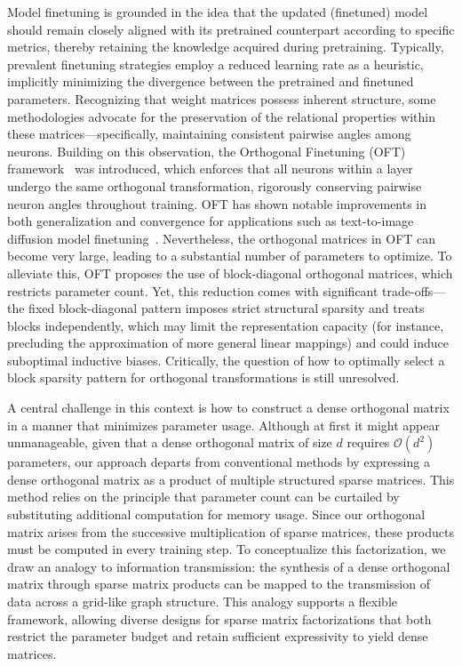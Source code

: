 Model finetuning is grounded in the idea that the updated (finetuned) model should remain closely aligned with its pretrained counterpart according to specific metrics, thereby retaining the knowledge acquired during pretraining. Typically, prevalent finetuning strategies employ a reduced learning rate as a heuristic, implicitly minimizing the divergence between the pretrained and finetuned parameters. Recognizing that weight matrices possess inherent structure, some methodologies advocate for the preservation of the relational properties within these matrices—specifically, maintaining consistent pairwise angles among neurons. Building on this observation, the Orthogonal Finetuning (OFT) framework~\cite{qiu2023controlling} was introduced, which enforces that all neurons within a layer undergo the same orthogonal transformation, rigorously conserving pairwise neuron angles throughout training. OFT has shown notable improvements in both generalization and convergence for applications such as text-to-image diffusion model finetuning~\cite{qiu2023controlling}. Nevertheless, the orthogonal matrices in OFT can become very large, leading to a substantial number of parameters to optimize. To alleviate this, OFT proposes the use of block-diagonal orthogonal matrices, which restricts parameter count. Yet, this reduction comes with significant trade-offs—the fixed block-diagonal pattern imposes strict structural sparsity and treats blocks independently, which may limit the representation capacity (for instance, precluding the approximation of more general linear mappings) and could induce suboptimal inductive biases. Critically, the question of how to optimally select a block sparsity pattern for orthogonal transformations is still unresolved.

A central challenge in this context is how to construct a dense orthogonal matrix in a manner that minimizes parameter usage. Although at first it might appear unmanageable, given that a dense orthogonal matrix of size $d$ requires $\mathcal{O}(d^2)$ parameters, our approach departs from conventional methods by expressing a dense orthogonal matrix as a product of multiple structured sparse matrices. This method relies on the principle that parameter count can be curtailed by substituting additional computation for memory usage. Since our orthogonal matrix arises from the successive multiplication of sparse matrices, these products must be computed in every training step. To conceptualize this factorization, we draw an analogy to information transmission: the synthesis of a dense orthogonal matrix through sparse matrix products can be mapped to the transmission of data across a grid-like graph structure. This analogy supports a flexible framework, allowing diverse designs for sparse matrix factorizations that both restrict the parameter budget and retain sufficient expressivity to yield dense matrices.

